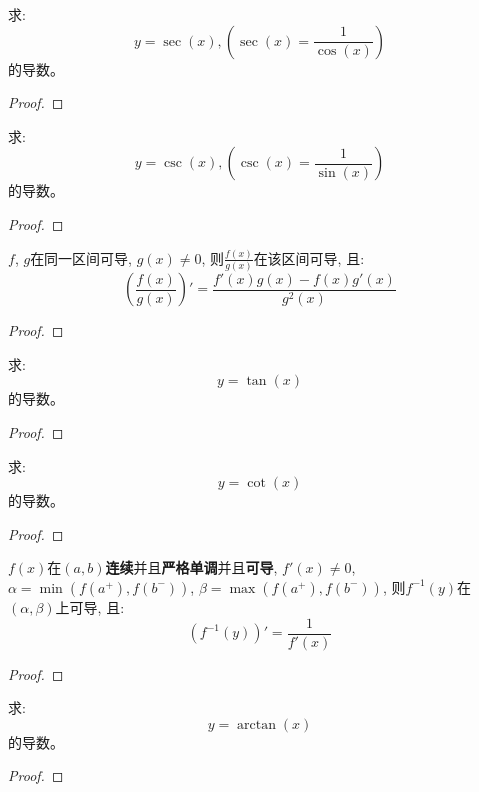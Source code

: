 \begin{proposition}
    求:
    \[ y = \sec(x), \left(\sec(x) = \frac{1}{\cos(x)}\right) \]
    的导数。
\end{proposition}
\begin{proof}
    
\end{proof}

\begin{proposition}
    求:
    \[ y = \csc(x), \left( \csc(x) = \frac{1}{\sin(x)} \right) \]
    的导数。
\end{proposition}
\begin{proof}
    
\end{proof}

\begin{lemma}
    $f$, $g$在同一区间可导, $g(x) \neq 0$, 则$\frac{f(x)}{g(x)}$在该区间可导, 且:
    \[ \left( \frac{f(x)}{g(x)} \right)' = \frac{f'(x)g(x)-f(x)g'(x)}{g^2(x)}\]
\end{lemma}
\begin{proof}
    
\end{proof}

\begin{proposition}
    求:
    \[ y = \tan(x) \]
    的导数。
\end{proposition}
\begin{proof}
    
\end{proof}

\begin{proposition}
    求:
    \[ y = \cot(x) \]
    的导数。
\end{proposition}
\begin{proof}
    
\end{proof}

\begin{theorem}[反函数求导定理]
    $f(x)$在$(a, b)${\bf 连续}并且{\bf 严格单调}并且{\bf 可导}, $f'(x) \neq 0$, $\alpha = \min\left( f(a^+), f(b^-)\right)$, $\beta = \max\left( f(a^+), f(b^-)\right)$, 则$f^{-1}(y)$在$(\alpha, \beta)$上可导, 且:
    \[ \left( f^{-1} (y) \right)' = \frac{1}{f'(x)} \]
\end{theorem}
\begin{proof}
    
\end{proof}

\begin{proposition}
    求:
    \[ y = \arctan(x) \]
    的导数。
\end{proposition}    
\begin{proof}
    
\end{proof}

